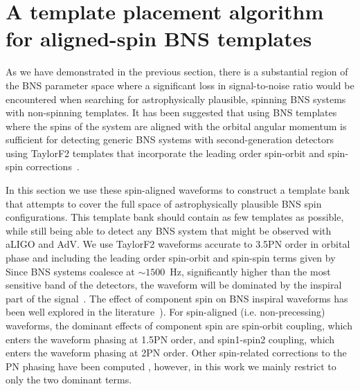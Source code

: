 \section{A template placement algorithm for aligned-spin BNS templates}
\label{sec:param_space}

As we have demonstrated in the previous section, there is a substantial region
of the BNS parameter space where a significant loss in signal-to-noise ratio
would be encountered when searching for astrophysically plausible, spinning
BNS systems with non-spinning templates. It has been suggested that using BNS
templates where the spins of the system are aligned with the orbital angular
momentum is sufficient for detecting generic BNS systems with second-generation
detectors~\cite{Ajith:2011ec} using TaylorF2 templates that incorporate the
leading order spin-orbit and spin-spin corrections~\cite{PW95}. 

In this section we use these spin-aligned waveforms to construct a template
bank that attempts to cover the full space of astrophysically plausible BNS
spin configurations. This template bank should contain as few templates as
possible, while still being able to detect any BNS system that might be
observed with aLIGO and AdV. We use TaylorF2
waveforms accurate to 3.5PN order in orbital phase and including the
leading order spin-orbit and spin-spin terms given by~\cite{PW95,Buonanno:2009zt}
Since BNS systems coalesce at $\sim 1500$~Hz, significantly higher than the
most sensitive band of the detectors, the waveform will be dominated by the
inspiral part of the signal~\cite{Buonanno:2009zt}.  The effect of component
spin on BNS inspiral waveforms has been well explored in the
literature~\cite{Apostolatos:1994mx,Kidder:1992fr,Kidder:1995zr,BCV03b}).
For spin-aligned (i.e. non-precessing) waveforms, the dominant effects of
component spin are spin-orbit coupling, which enters the waveform phasing at
1.5PN order, and spin1-spin2 coupling, which enters the waveform phasing at
2PN order.  Other spin-related corrections to the PN phasing have been
computed \cite{Mikoczi:2005dn,Arun:2008kb}, however, in this work we mainly restrict
to only the two dominant terms. 

